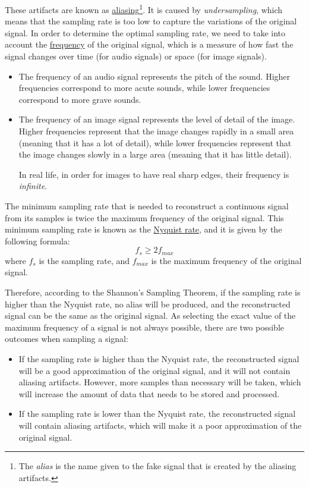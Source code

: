 These artifacts are known as \ul{aliasing}\footnote{The \emph{alias} is the name given to the fake signal that is created by the aliasing artifacts.}. It is caused by \emph{undersampling}, which means that the sampling rate is too low to capture the variations of the original signal. In order to determine the optimal sampling rate, we need to take into account the \ul{frequency} of the original signal, which is a measure of how fast the signal changes over time (for audio signals) or space (for image signals).
\begin{itemize}
    \item The frequency of an audio signal represents the pitch of the sound. Higher frequencies correspond to more acute sounds, while lower frequencies correspond to more grave sounds.
    \item The frequency of an image signal represents the level of detail of the image. Higher frequencies represent that the image changes rapidly in a small area (meaning that it has a lot of detail), while lower frequencies represent that the image changes slowly in a large area (meaning that it has little detail).
    
    In real life, in order for images to have real sharp edges, their frequency is \emph{infinite}.
\end{itemize}
\begin{teo}
    The minimum sampling rate that is needed to reconstruct a continuous signal from its samples is twice the maximum frequency of the original signal. This minimum sampling rate is known as the \ul{Nyquist rate}, and it is given by the following formula:
    \begin{equation}
        f_s \geq 2 f_{max}
    \end{equation}
    where $f_s$ is the sampling rate, and $f_{max}$ is the maximum frequency of the original signal.
\end{teo}

Therefore, according to the Shannon's Sampling Theorem, if the sampling rate is higher than the Nyquist rate, no alias will be produced, and the reconstructed signal can be the same as the original signal. As selecting the exact value of the maximum frequency of a signal is not always possible, there are two possible outcomes when sampling a signal:
\begin{itemize}
    \item If the sampling rate is higher than the Nyquist rate, the reconstructed signal will be a good approximation of the original signal, and it will not contain aliasing artifacts. However, more samples than necessary will be taken, which will increase the amount of data that needs to be stored and processed.
    \item If the sampling rate is lower than the Nyquist rate, the reconstructed signal will contain aliasing artifacts, which will make it a poor approximation of the original signal.
\end{itemize}

